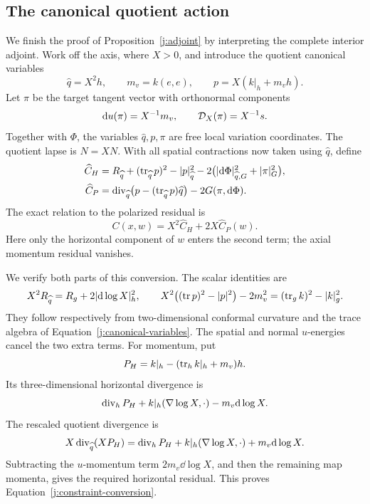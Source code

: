 \subsection{The canonical quotient action}

We finish the proof of Proposition~\ref{j:adjoint} by interpreting the
complete interior adjoint. Work off the axis, where \(X>0\), and introduce
the quotient canonical variables
\begin{equation}
\label{j:canonical-variables}
 \widehat q=X^2h,\qquad m_v=k(e,e),\qquad
 p=X(k|_h+m_vh).
\end{equation}
Let \(\pi\) be the target tangent vector with orthonormal components
\begin{equation}
\label{j:canonical-momentum}
 \mathrm d u(\pi)=X^{-1}m_v,\qquad
 \mathcal D_X(\pi)=X^{-1}s.
\end{equation}
Together with \(\Phi\), the variables \(\widehat q,p,\pi\) are free local
variation coordinates. The quotient lapse is \(\widehat N=XN\).
With all spatial contractions now taken using \(\widehat q\), define
\begin{equation}
\label{j:canonical-constraints}
 \begin{split}
 \widehat C_H
 &=R_{\widehat q}+(\operatorname{tr}_{\widehat q}p)^2-|p|_{\widehat q}^2
                  -2\bigl(|\mathrm d\Phi|_{\widehat q,G}^2+|\pi|_G^2\bigr),\\
 \widehat C_P
 &=\operatorname{div}_{\widehat q}
           \bigl(p-(\operatorname{tr}_{\widehat q}p)\widehat q\bigr)
                      -2G(\pi,\mathrm d\Phi).
 \end{split}
\end{equation}
The exact relation to the polarized residual is
\begin{equation}
\label{j:constraint-conversion}
 C(x,w)=X^2\widehat C_H+2X\widehat C_P(w).
\end{equation}
Here only the horizontal component of \(w\) enters the second term;
the axial momentum residual vanishes.

We verify both parts of this conversion. The scalar identities are
\[
 X^2R_{\widehat q}=R_g+2|\mathrm d\log X|_h^2,
 \qquad
 X^2\bigl((\operatorname{tr} p)^2-|p|^2\bigr)-2m_v^2
                      =(\operatorname{tr}_gk)^2-|k|_g^2.
\]
They follow respectively from two-dimensional conformal curvature and
the trace algebra of Equation~\eqref{j:canonical-variables}. The spatial
and normal \(u\)-energies cancel the two extra terms. For momentum, put
\[
 P_H=k|_h-(\operatorname{tr}_h k|_h+m_v)h.
\]
Its three-dimensional horizontal divergence is
\[
 \operatorname{div}_hP_H+k|_h(\nabla\log X,\cdot)-m_v\mathrm d\log X.
\]
The rescaled quotient divergence is
\[
 X\operatorname{div}_{\widehat q}(XP_H)
   =\operatorname{div}_hP_H+k|_h(\nabla\log X,\cdot)+m_v\mathrm d\log X.
\]
Subtracting the \(u\)-momentum term \(2m_v\dd\log X\), and then the
remaining map momenta, gives the required horizontal residual. This
proves Equation~\eqref{j:constraint-conversion}.


